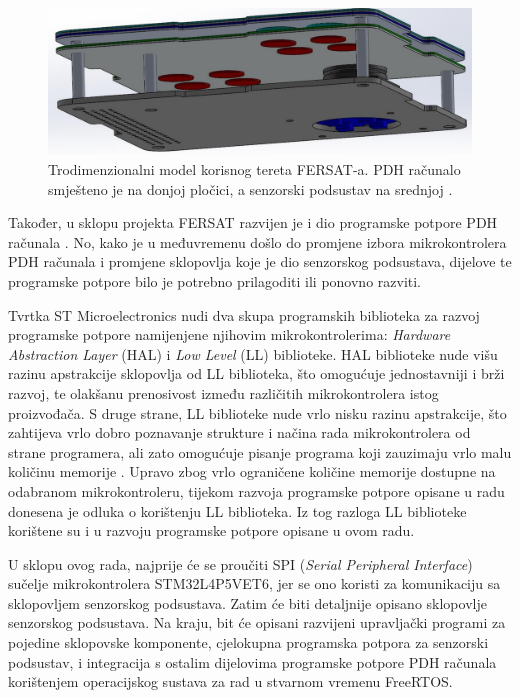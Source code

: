     \begin{figure}[htb]
        \centering
        \includegraphics[width=\textwidth]{slike/fersat_3d.png}
        \caption{Trodimenzionalni model korisnog tereta FERSAT-a. PDH računalo smješteno je na donjoj pločici, a senzorski podsustav na srednjoj \cite{zavrsni_filip_juric}.}
        \label{fig:fersat_3d}
    \end{figure}

    Također, u sklopu projekta FERSAT razvijen je i dio programske potpore PDH računala \cite{diplomski_goran_petrak}. No, kako je u međuvremenu došlo do promjene izbora mikrokontrolera PDH računala i promjene sklopovlja koje je dio senzorskog podsustava, dijelove te programske potpore bilo je potrebno prilagoditi ili ponovno razviti.

    Tvrtka ST Microelectronics nudi dva skupa programskih biblioteka za razvoj programske potpore namijenjene njihovim mikrokontrolerima: \textit{Hardware Abstraction Layer} (HAL) i \textit{Low Level} (LL) biblioteke. HAL biblioteke nude višu razinu apstrakcije sklopovlja od LL biblioteka, što omogućuje jednostavniji i brži razvoj, te olakšanu prenosivost između različitih mikrokontrolera istog proizvođača. S druge strane, LL biblioteke nude vrlo nisku razinu apstrakcije, što zahtijeva vrlo dobro poznavanje strukture i načina rada mikrokontrolera od strane programera, ali zato omogućuje pisanje programa koji zauzimaju vrlo malu količinu memorije \cite{stm_hal_ll}. Upravo zbog vrlo ograničene količine memorije dostupne na odabranom mikrokontroleru, tijekom razvoja programske potpore opisane u radu \cite{diplomski_goran_petrak} donesena je odluka o korištenju LL biblioteka. Iz tog razloga LL biblioteke korištene su i u razvoju programske potpore opisane u ovom radu.

    U sklopu ovog rada, najprije će se proučiti SPI (\textit{Serial Peripheral Interface}) sučelje mikrokontrolera STM32L4P5VET6, jer se ono koristi za komunikaciju sa sklopovljem senzorskog podsustava. Zatim će biti detaljnije opisano sklopovlje senzorskog podsustava. Na kraju, bit će opisani razvijeni upravljački programi za pojedine sklopovske komponente, cjelokupna programska potpora za senzorski podsustav, i integracija s ostalim dijelovima programske potpore PDH računala korištenjem operacijskog sustava za rad u stvarnom vremenu FreeRTOS.
